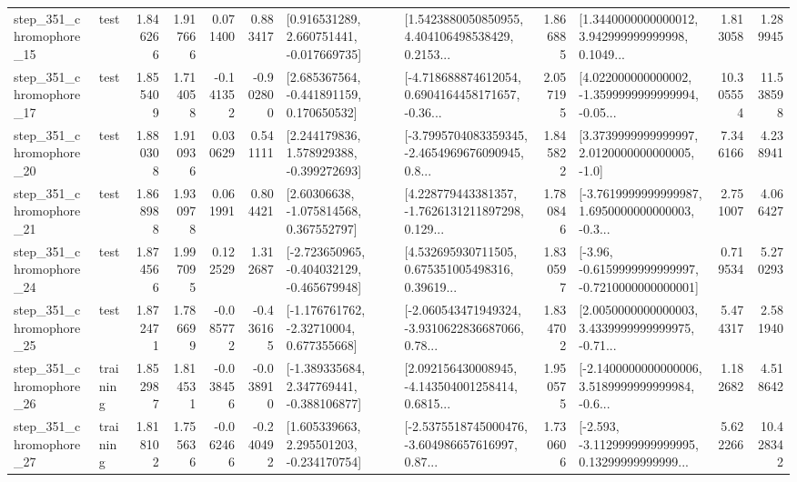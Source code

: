\begin{tabular}{llrrrrllrlrr}
  step\_351\_chromophore\_15 &      test &      1.846266 &    1.917666 &      0.071400 &  0.883417 &    [0.916531289, 2.660751441, -0.017669735] &  [1.5423880050850955, 4.404106498538429, 0.2153... &       1.866885 &  [1.3440000000000012, 3.942999999999998, 0.1049... &            1.813058 &          1.289945 \\
  step\_351\_chromophore\_17 &      test &      1.855409 &    1.714058 &     -0.141352 & -0.902800 &    [2.685367564, -0.441891159, 0.170650532] &  [-4.718688874612054, 0.6904164458171657, -0.36... &       2.057195 &  [4.022000000000002, -1.3599999999999994, -0.05... &           10.305554 &         11.538598 \\
  step\_351\_chromophore\_20 &      test &      1.880308 &    1.910936 &      0.030629 &  0.541111 &    [2.244179836, 1.578929388, -0.399272693] &  [-3.7995704083359345, -2.4654969676090945, 0.8... &       1.845822 &     [3.3739999999999997, 2.0120000000000005, -1.0] &            7.346166 &          4.238941 \\
  step\_351\_chromophore\_21 &      test &      1.868988 &    1.930978 &      0.061991 &  0.804421 &     [2.60306638, -1.075814568, 0.367552797] &  [4.228779443381357, -1.7626131211897298, 0.129... &       1.780846 &  [-3.7619999999999987, 1.6950000000000003, -0.3... &            2.751007 &          4.066427 \\
  step\_351\_chromophore\_24 &      test &      1.874566 &    1.997095 &      0.122529 &  1.312687 &  [-2.723650965, -0.404032129, -0.465679948] &  [4.532695930711505, 0.675351005498316, 0.39619... &       1.830597 &  [-3.96, -0.6159999999999997, -0.7210000000000001] &            0.719534 &          5.270293 \\
  step\_351\_chromophore\_25 &      test &      1.872471 &    1.786699 &     -0.085772 & -0.436165 &    [-1.176761762, -2.32710004, 0.677355668] &  [-2.060543471949324, -3.9310622836687066, 0.78... &       1.834702 &  [2.0050000000000003, 3.4339999999999975, -0.71... &            5.474317 &          2.581940 \\
  step\_351\_chromophore\_26 &  training &      1.852987 &    1.814531 &     -0.038456 & -0.038910 &   [-1.389335684, 2.347769441, -0.388106877] &  [2.092156430008945, -4.143504001258414, 0.6815... &       1.950575 &  [-2.1400000000000006, 3.5189999999999984, -0.6... &            1.182682 &          4.518642 \\
  step\_351\_chromophore\_27 &  training &      1.818102 &    1.755636 &     -0.062466 & -0.240492 &    [1.605339663, 2.295501203, -0.234170754] &  [-2.5375518745000476, -3.604986657616997, 0.87... &       1.730606 &  [-2.593, -3.1129999999999995, 0.13299999999999... &            5.622266 &         10.428342 \\

\end{tabular}
